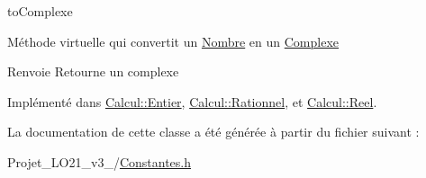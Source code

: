 to\-Complexe 

Méthode virtuelle qui convertit un \hyperlink{class_calcul_1_1_nombre}{Nombre} en un \hyperlink{class_calcul_1_1_complexe}{Complexe} \begin{DoxyReturn}{Renvoie}
Retourne un complexe 
\end{DoxyReturn}


Implémenté dans \hyperlink{class_calcul_1_1_entier_a7d0bcf436ce6517b8738f79eadda1f8a}{Calcul\-::\-Entier}, \hyperlink{class_calcul_1_1_rationnel_aad6bfa4160014c1ad603373a31383d76}{Calcul\-::\-Rationnel}, et \hyperlink{class_calcul_1_1_reel_a222b9929b24dfee2928191055f1d03fa}{Calcul\-::\-Reel}.



La documentation de cette classe a été générée à partir du fichier suivant \-:\begin{DoxyCompactItemize}
\item 
Projet\-\_\-\-L\-O21\-\_\-v3\-\_/\hyperlink{_constantes_8h}{Constantes.\-h}\end{DoxyCompactItemize}

